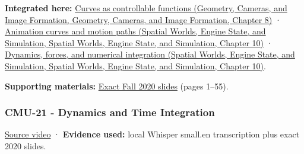 \textbf{Integrated here:} \href{../03-Geometry-Cameras-and-Image-Formation/main.pdf\#nameddest=03-visual-computing-i-ch001-curves-as-controllable-functions}{Curves as controllable functions (Geometry, Cameras, and Image Formation, Geometry, Cameras, and Image Formation, Chapter 8)} · \href{../05-Spatial-Worlds-Engine-State-and-Simulation/main.pdf\#nameddest=04-visual-computing-ii-ch029-animation-curves-and-motion-paths}{Animation curves and motion paths (Spatial Worlds, Engine State, and Simulation, Spatial Worlds, Engine State, and Simulation, Chapter 10)} · \href{../05-Spatial-Worlds-Engine-State-and-Simulation/main.pdf\#nameddest=04-visual-computing-ii-ch029-dynamics-forces-and-numerical-integration}{Dynamics, forces, and numerical integration (Spatial Worlds, Engine State, and Simulation, Spatial Worlds, Engine State, and Simulation, Chapter 10)}.

\textbf{Supporting materials:} \href{https://15462.courses.cs.cmu.edu/fall2020content/lectures/20_introanimation/20_introanimation_slides.pdf}{Exact Fall 2020 slides} (pages 1--55).

\subsubsection{CMU-21 - Dynamics and Time Integration}\label{04-visual-computing-ii-ch036-cmu-21---dynamics-and-time-integration}

\href{https://www.youtube.com/watch?v=Fi9xu3z97W4}{Source video} · \textbf{Evidence used:} local Whisper small.en transcription plus exact 2020 slides.

